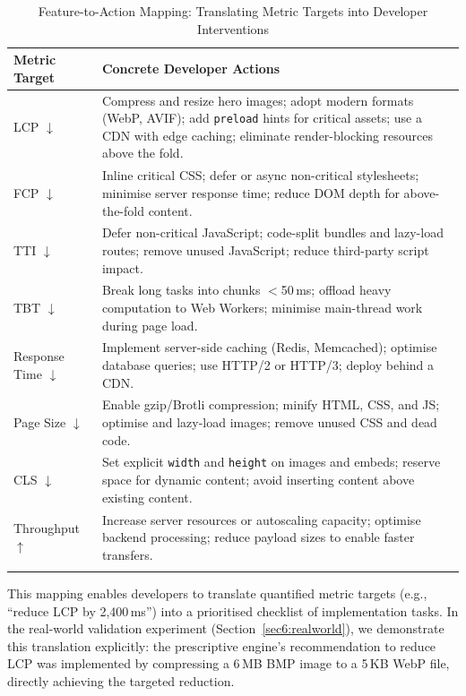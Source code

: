 \documentclass[sn-nature]{sn-jnl}
\begin{document}
\begin{table}[htbp]
\caption{Feature-to-Action Mapping: Translating Metric Targets into Developer Interventions}\label{tab:action_mapping}
\centering
\begin{tabular}{p{} p{}}
\toprule
Metric Target & Concrete Developer Actions \\
\midrule
LCP $\downarrow$ &
Compress and resize hero images; adopt modern formats (WebP, AVIF); add \texttt{preload} hints for critical assets; use a CDN with edge caching; eliminate render-blocking resources above the fold. \\

FCP $\downarrow$ &
Inline critical CSS; defer or async non-critical stylesheets; minimise server response time; reduce DOM depth for above-the-fold content. \\

TTI $\downarrow$ &
Defer non-critical JavaScript; code-split bundles and lazy-load routes; remove unused JavaScript; reduce third-party script impact. \\

TBT $\downarrow$ &
Break long tasks into chunks $<$50\,ms; offload heavy computation to Web Workers; minimise main-thread work during page load. \\

Response Time $\downarrow$ &
Implement server-side caching (Redis, Memcached); optimise database queries; use HTTP/2 or HTTP/3; deploy behind a CDN. \\

Page Size $\downarrow$ &
Enable gzip/Brotli compression; minify HTML, CSS, and JS; optimise and lazy-load images; remove unused CSS and dead code. \\

CLS $\downarrow$ &
Set explicit \texttt{width} and \texttt{height} on images and embeds; reserve space for dynamic content; avoid inserting content above existing content. \\

Throughput $\uparrow$ &
Increase server resources or autoscaling capacity; optimise backend processing; reduce payload sizes to enable faster transfers. \\
\botrule
\end{tabular}
\end{table}

This mapping enables developers to translate quantified metric targets (e.g., ``reduce LCP by 2,400\,ms'') into a prioritised checklist of implementation tasks. In the real-world validation experiment (Section~\ref{sec6:realworld}), we demonstrate this translation explicitly: the prescriptive engine's recommendation to reduce LCP was implemented by compressing a 6\,MB BMP image to a 5\,KB WebP file, directly achieving the targeted reduction.
\end{document}
